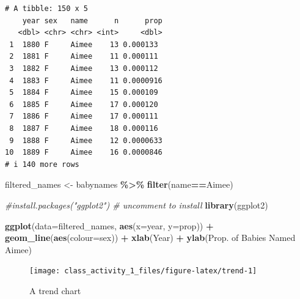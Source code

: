 \documentclass[
]{book}
\newenvironment{Shaded}{\begin{snugshade}}{\end{snugshade}}
\newcommand{\AttributeTok}[1]{\textcolor[rgb]{0.13,0.29,0.53}{#1}}
\newcommand{\CommentTok}[1]{\textcolor[rgb]{0.56,0.35,0.01}{\textit{#1}}}
\newcommand{\FunctionTok}[1]{\textcolor[rgb]{0.13,0.29,0.53}{\textbf{#1}}}
\newcommand{\NormalTok}[1]{#1}
\newcommand{\OtherTok}[1]{\textcolor[rgb]{0.56,0.35,0.01}{#1}}
\newcommand{\SpecialCharTok}[1]{\textcolor[rgb]{0.81,0.36,0.00}{\textbf{#1}}}
\newcommand{\StringTok}[1]{\textcolor[rgb]{0.31,0.60,0.02}{#1}}
\begin{document}
\begin{verbatim}
# A tibble: 150 x 5
    year sex   name      n      prop
   <dbl> <chr> <chr> <int>     <dbl>
 1  1880 F     Aimee    13 0.000133 
 2  1881 F     Aimee    11 0.000111 
 3  1882 F     Aimee    13 0.000112 
 4  1883 F     Aimee    11 0.0000916
 5  1884 F     Aimee    15 0.000109 
 6  1885 F     Aimee    17 0.000120 
 7  1886 F     Aimee    17 0.000111 
 8  1887 F     Aimee    18 0.000116 
 9  1888 F     Aimee    12 0.0000633
10  1889 F     Aimee    16 0.0000846
# i 140 more rows
\end{verbatim}

\begin{Shaded}
\begin{Highlighting}[]
\NormalTok{filtered\_names }\OtherTok{\textless{}{-}}\NormalTok{ babynames }\SpecialCharTok{\%\textgreater{}\%} \FunctionTok{filter}\NormalTok{(name}\SpecialCharTok{==}\StringTok{\textquotesingle{}Aimee\textquotesingle{}}\NormalTok{)}
\end{Highlighting}
\end{Shaded}

\begin{Shaded}
\begin{Highlighting}[]
\CommentTok{\#install.packages("ggplot2")   \# uncomment to install}
\FunctionTok{library}\NormalTok{(ggplot2)}
\end{Highlighting}
\end{Shaded}

\begin{Shaded}
\begin{Highlighting}[]
\FunctionTok{ggplot}\NormalTok{(}\AttributeTok{data=}\NormalTok{filtered\_names, }\FunctionTok{aes}\NormalTok{(}\AttributeTok{x=}\NormalTok{year, }\AttributeTok{y=}\NormalTok{prop)) }\SpecialCharTok{+} 
  \FunctionTok{geom\_line}\NormalTok{(}\FunctionTok{aes}\NormalTok{(}\AttributeTok{colour=}\NormalTok{sex)) }\SpecialCharTok{+} 
  \FunctionTok{xlab}\NormalTok{(}\StringTok{\textquotesingle{}Year\textquotesingle{}}\NormalTok{) }\SpecialCharTok{+} 
  \FunctionTok{ylab}\NormalTok{(}\StringTok{\textquotesingle{}Prop. of Babies Named Aimee\textquotesingle{}}\NormalTok{)}
\end{Highlighting}
\end{Shaded}

\begin{figure}
\texttt{[image: class\_activity\_1\_files/figure-latex/trend-1]} \caption{A trend chart}\label{fig:trend}
\end{figure}
\end{document}
